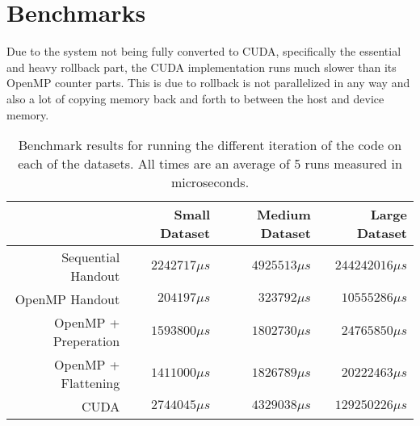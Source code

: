 \section{Benchmarks}
Due to the system not being fully converted to CUDA, specifically the essential and heavy rollback part, the CUDA implementation runs much slower than its OpenMP counter parts. This is due to rollback is not parallelized in any way and also a lot of copying memory back and forth to between the host and device memory.

\begin{table}[H]
    \centering
    \begin{tabular}{r|r|r|r}
                             &  Small Dataset & Medium Dataset &    Large Dataset \\ \hline
        Sequential Handout   & $2242717\mu s$ & $4925513\mu s$ & $244242016\mu s$ \\
        OpenMP Handout       &  $204197\mu s$ &  $323792\mu s$ &  $10555286\mu s$ \\
        OpenMP + Preperation & $1593800\mu s$ & $1802730\mu s$ &  $24765850\mu s$ \\
        OpenMP + Flattening  & $1411000\mu s$ & $1826789\mu s$ &  $20222463\mu s$ \\
        CUDA                 & $2744045\mu s$ & $4329038\mu s$ & $129250226\mu s$ \\
    \end{tabular}
    \caption{Benchmark results for running the different iteration of the code
        on each of the datasets. All times are an average of 5 runs measured in
        microseconds.}
    \label{tab:benchmarks}
\end{table}









